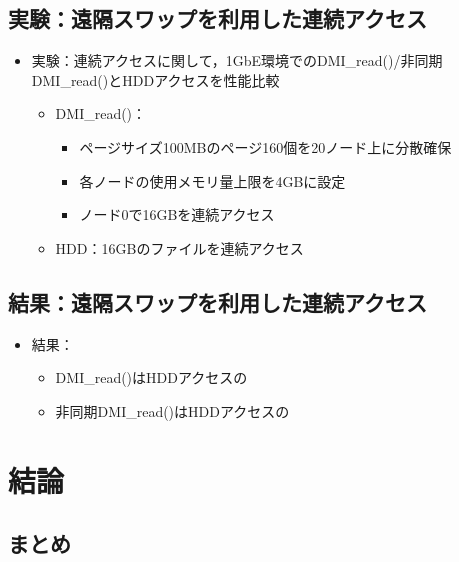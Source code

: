 \documentclass[25pt,landscape,papersize]{jsarticle}
\begin{document}

\subsection{実験：遠隔スワップを利用した連続アクセス}

\begin{itemize}
\item 実験：連続アクセスに関して，1GbE環境でのDMI\_read()/非同期DMI\_read()とHDDアクセスを性能比較
  \begin{itemize}
  \item DMI\_read()：
    \begin{itemize}
    \item ページサイズ100MBのページ160個を20ノード上に分散確保
    \item 各ノードの使用メモリ量上限を4GBに設定
    \item ノード0で16GBを連続アクセス
    \end{itemize}
  \item HDD：16GBのファイルを連続アクセス
  \end{itemize}
\end{itemize}


\subsection{結果：遠隔スワップを利用した連続アクセス}

\begin{itemize}
\item 結果：
  \begin{itemize}
  \item DMI\_read()はHDDアクセスの
  \item 非同期DMI\_read()はHDDアクセスの
  \end{itemize}
\end{itemize}



\section{結論}

\subsection{まとめ}
\end{document}
